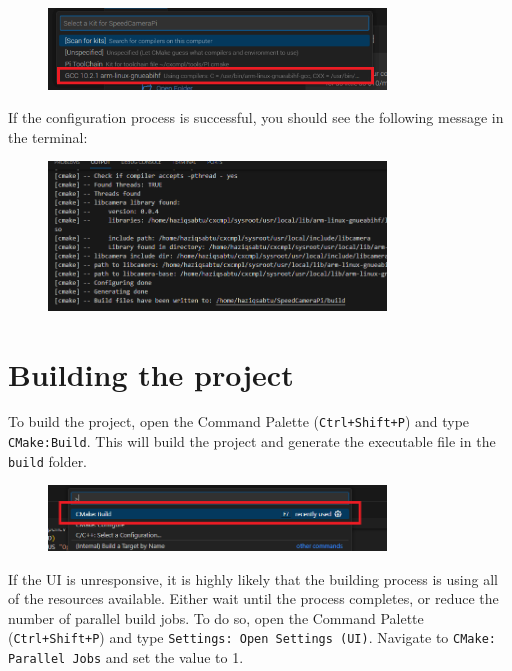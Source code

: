 \begin{figure}[H]
      \centering
      \includegraphics[width=0.8\textwidth]{texs/chapter1/image/cppconf4.png}
\end{figure}

If the configuration process is successful, you should see the following message in the terminal:

\begin{figure}[H]
      \centering
      \includegraphics[width=0.8\textwidth]{texs/chapter1/image/cppconf3.png}
\end{figure}

\section{Building the project}

To build the project, open the Command Palette (\texttt{Ctrl+Shift+P}) and type \texttt{CMake:Build}. This will build the project and generate the executable file in the \texttt{build} folder.

\begin{figure}[H]
      \centering
      \includegraphics[width=0.8\textwidth]{texs/chapter1/image/cppbuild.png}
\end{figure}

If the UI is unresponsive, it is highly likely that the building process is using all of the resources available. Either wait until the process completes, or reduce the number of parallel build jobs. To do so, open the Command Palette (\texttt{Ctrl+Shift+P}) and type \texttt{Settings: Open Settings (UI)}. Navigate to \texttt{CMake: Parallel Jobs} and set the value to 1.

